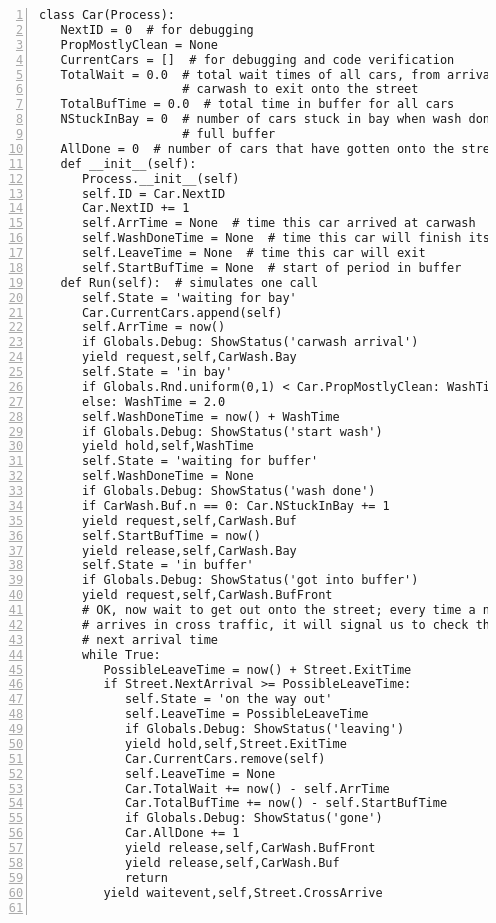 \documentclass[11pt]{article}
\begin{document}
\begin{Verbatim}[fontsize=\relsize{-2},numbers=left]
class Car(Process):
   NextID = 0  # for debugging
   PropMostlyClean = None
   CurrentCars = []  # for debugging and code verification
   TotalWait = 0.0  # total wait times of all cars, from arrival to
                    # carwash to exit onto the street
   TotalBufTime = 0.0  # total time in buffer for all cars
   NStuckInBay = 0  # number of cars stuck in bay when wash done, due to
                    # full buffer
   AllDone = 0  # number of cars that have gotten onto the street
   def __init__(self):
      Process.__init__(self)
      self.ID = Car.NextID
      Car.NextID += 1
      self.ArrTime = None  # time this car arrived at carwash
      self.WashDoneTime = None  # time this car will finish its wash
      self.LeaveTime = None  # time this car will exit
      self.StartBufTime = None  # start of period in buffer
   def Run(self):  # simulates one call
      self.State = 'waiting for bay'
      Car.CurrentCars.append(self)
      self.ArrTime = now()
      if Globals.Debug: ShowStatus('carwash arrival')
      yield request,self,CarWash.Bay
      self.State = 'in bay'
      if Globals.Rnd.uniform(0,1) < Car.PropMostlyClean: WashTime = 1.0
      else: WashTime = 2.0
      self.WashDoneTime = now() + WashTime
      if Globals.Debug: ShowStatus('start wash')
      yield hold,self,WashTime
      self.State = 'waiting for buffer'
      self.WashDoneTime = None
      if Globals.Debug: ShowStatus('wash done')
      if CarWash.Buf.n == 0: Car.NStuckInBay += 1
      yield request,self,CarWash.Buf
      self.StartBufTime = now()
      yield release,self,CarWash.Bay
      self.State = 'in buffer'
      if Globals.Debug: ShowStatus('got into buffer')
      yield request,self,CarWash.BufFront 
      # OK, now wait to get out onto the street; every time a new car
      # arrives in cross traffic, it will signal us to check the new
      # next arrival time
      while True:
         PossibleLeaveTime = now() + Street.ExitTime
         if Street.NextArrival >= PossibleLeaveTime:
            self.State = 'on the way out'
            self.LeaveTime = PossibleLeaveTime
            if Globals.Debug: ShowStatus('leaving')
            yield hold,self,Street.ExitTime
            Car.CurrentCars.remove(self)
            self.LeaveTime = None
            Car.TotalWait += now() - self.ArrTime
            Car.TotalBufTime += now() - self.StartBufTime
            if Globals.Debug: ShowStatus('gone')
            Car.AllDone += 1
            yield release,self,CarWash.BufFront
            yield release,self,CarWash.Buf
            return
         yield waitevent,self,Street.CrossArrive


\end{Verbatim}
\end{document}
